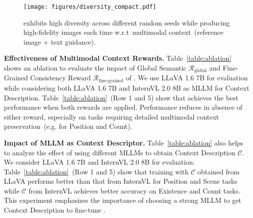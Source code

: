 
\begin{figure}[!t]
    \vspace{-1mm}
    \centering
    \texttt{[image: figures/diversity\_compact.pdf]}
    \vspace{-6mm}
    \caption{\method exhibits high diversity across different random seeds while producing high-fidelity images each time w.r.t~multimodal context~(reference image + text guidance).}
    \label{fig:diversity}
    \vspace{-4mm}
\end{figure}

\textbf{Effectiveness of Multimodal Context Rewards.} Table~\ref{table:ablation} shows an ablation to evaluate the impact of Global Semantic $\mathcal{R}_\textrm{global}$ and Fine-Grained Consistency Reward $\mathcal{R}_\textrm{fine-grained}$ of \method. We use LLaVA 1.6 7B for evaluation while considering both LLaVA 1.6 7B and InternVL 2.0 8B as MLLM for Context Description. Table~\ref{table:ablation}~(Row 1 and 5) show that \method achieves the best performance when both rewards are applied. Performance reduces in absence of either reward, especially on tasks requiring detailed multimodal context preservation~(e.g. for Position and Count).
 


\textbf{Impact of MLLM as Context Descriptor.} Table~\ref{table:ablation} also helps to analyze the effect of using different MLLMs to obtain Context Description $\mathcal{C}$. We consider LLaVA 1.6 7B and InternVL 2.0 8B for evaluation. Table~\ref{table:ablation}~(Row 1 and 5) show that training \method with $\mathcal{C}$ obtained from LLaVA performs better than that from InternVL for Position and Scene tasks while $\mathcal{C}$ from InternVL achieves better accuracy on Existence and Count tasks. This experiment emphasizes the importance of choosing a strong MLLM to get Context Description to fine-tune \method.

